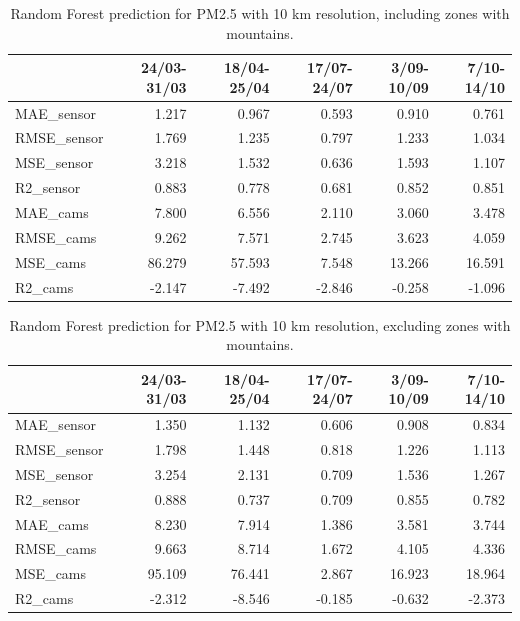 \begin{table}[H]
\begin{tabular}{lrrrrr}
\toprule
  &  24/03-31/03 &  18/04-25/04 &  17/07-24/07 &  3/09-10/09 &  7/10-14/10 \\
\midrule
 MAE\_sensor &        1.217 &        0.967 &        0.593 &       0.910 &       0.761 \\
RMSE\_sensor &        1.769 &        1.235 &        0.797 &       1.233 &       1.034 \\
 MSE\_sensor &        3.218 &        1.532 &        0.636 &       1.593 &       1.107 \\
  R2\_sensor &        0.883 &        0.778 &        0.681 &       0.852 &       0.851 \\
   MAE\_cams &        7.800 &        6.556 &        2.110 &       3.060 &       3.478 \\
  RMSE\_cams &        9.262 &        7.571 &        2.745 &       3.623 &       4.059 \\
   MSE\_cams &       86.279 &       57.593 &        7.548 &      13.266 &      16.591 \\
    R2\_cams &       -2.147 &       -7.492 &       -2.846 &      -0.258 &      -1.096 \\
\bottomrule
\end{tabular}
\caption{Random Forest prediction for PM2.5 with 10 km resolution, including zones with mountains.}
\end{table}
\bigskip
\begin{table}[H]
\begin{tabular}{lrrrrr}
\toprule
  &  24/03-31/03 &  18/04-25/04 &  17/07-24/07 &  3/09-10/09 &  7/10-14/10 \\
\midrule
 MAE\_sensor &        1.350 &        1.132 &        0.606 &       0.908 &       0.834 \\
RMSE\_sensor &        1.798 &        1.448 &        0.818 &       1.226 &       1.113 \\
 MSE\_sensor &        3.254 &        2.131 &        0.709 &       1.536 &       1.267 \\
  R2\_sensor &        0.888 &        0.737 &        0.709 &       0.855 &       0.782 \\
   MAE\_cams &        8.230 &        7.914 &        1.386 &       3.581 &       3.744 \\
  RMSE\_cams &        9.663 &        8.714 &        1.672 &       4.105 &       4.336 \\
   MSE\_cams &       95.109 &       76.441 &        2.867 &      16.923 &      18.964 \\
    R2\_cams &       -2.312 &       -8.546 &       -0.185 &      -0.632 &      -2.373 \\
\bottomrule
\end{tabular}
\caption{Random Forest prediction for PM2.5 with 10 km resolution, excluding zones with mountains.}
\end{table}

